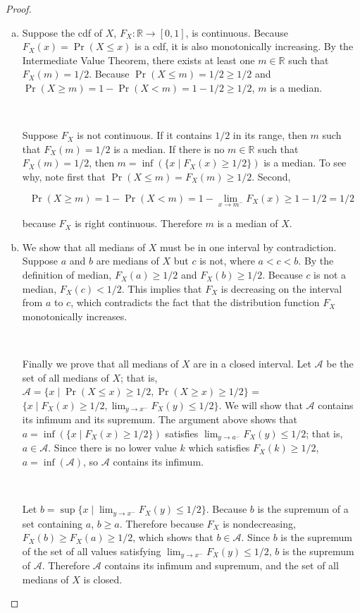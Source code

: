 \begin{proof} 

\begin{enumerate}[(a)]

\item Suppose the cdf of \(X\), \(F_X: \mathbb{R} \to [0, 1]\), is continuous. Because \(F_X(x) = \Pr(X \leq x)\) is a cdf, it is also monotonically increasing. By the Intermediate Value Theorem, there exists at least one \(m \in \mathbb{R}\) such that \(F_X(m) = 1/2\). Because \(\Pr(X \leq m) = 1/2 \geq 1/2\) and \(\Pr(X \geq m) = 1 - \Pr(X < m) = 1 - 1/2 \geq 1/2\), \(m\) is a median.

\

Suppose \(F_X\) is not continuous. If it contains \(1/2\) in its range, then \(m\) such that \(F_X(m) = 1/2\) is a median. If there is no \(m \in \mathbb{R}\) such that \(F_X(m) = 1/2\), then \(m = \inf( \{x \mid F_X(x) \geq 1/2 \} )\) is a median. To see why, note first that \( \Pr(X \leq m) = F_X(m) \geq 1/2\). Second, 

\[
\Pr(X \geq m) = 1 - \Pr(X < m) = 1 - \lim_{x \to m^-} F_X(x) \geq 1 - 1/2 = 1/2
\]

because \(F_X\) is right continuous. Therefore \(m\) is a median of \(X\).

\item We show that all medians of \(X\) must be in one interval by contradiction. Suppose \(a\) and \(b\) are medians of \(X\) but \( c\) is not, where \(a < c < b\). By the definition of median, \(F_X(a) \geq 1/2\) and \(F_X(b) \geq 1/2\). Because \(c\) is not a median, \(F_X(c) < 1/2\). This implies that \(F_X\) is decreasing on the interval from \(a\) to \(c\), which contradicts the fact that the distribution function \(F_X\) monotonically increases.

\

Finally we prove that all medians of \(X\) are in a closed interval. Let \(\mathcal{A}\) be the set of all medians of \(X\); that is, \(\mathcal{A} = \{ x \mid  \Pr(X \leq x) \geq 1/2, \Pr(X \geq x) \geq 1/2 \}\) =  \( \{ x \mid  F_X(x) \geq 1/2, \lim_{y \to x^-}F_X(y) \leq 1/2 \}\). We will show that \(\mathcal{A}\) contains its infimum and its supremum. The argument above shows that \(a = \inf( \{x \mid F_X(x) \geq 1/2 \} )\) satisfies \( \lim_{y \to a^-}F_X(y) \leq 1/2 \); that is, \(a \in \mathcal{A}\). Since there is no lower value \(k\) which satisfies \(F_X(k) \geq 1/2\), \(a = \inf(\mathcal{A})\), so \(\mathcal{A}\) contains its infimum. 

\

Let \(b = \sup\{x \mid \lim_{y \to x^-}F_X(y) \leq 1/2\}\). Because \(b\) is the supremum of a set containing \(a\), \(b \geq a\). Therefore because \(F_X\) is nondecreasing, \(F_X(b) \geq F_X(a) \geq 1/2\), which shows that \(b \in \mathcal{A}\). Since \(b\) is the supremum of the set of all values satisfying \(\lim_{y \to x^-}F_X(y) \leq 1/2\), \(b\) is the supremum of \(\mathcal{A}\). Therefore \(\mathcal{A}\) contains its infimum and supremum, and the set of all medians of \(X\) is closed.

\end{enumerate}

\end{proof}

